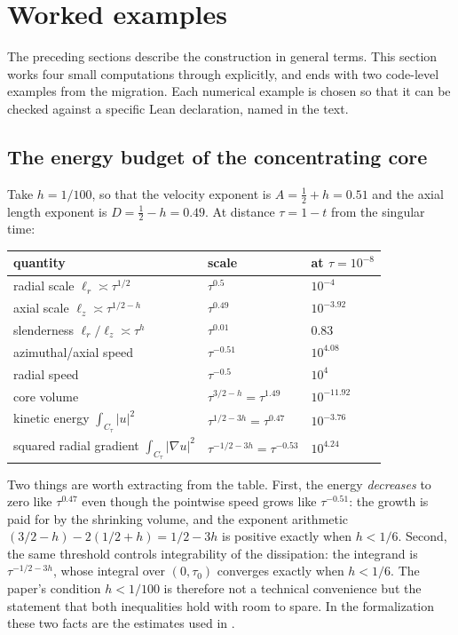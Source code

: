 \section{Worked examples}
\label{sec:examples}

The preceding sections describe the construction in general terms. This section works
four small computations through explicitly, and ends with two code-level examples from the
migration. Each numerical example is chosen so that it can be checked against a specific
Lean declaration, named in the text.

\subsection{The energy budget of the concentrating core}
\label{ex:energy}

Take $h=1/100$, so that the velocity exponent is $A=\tfrac12+h=0.51$ and the axial length
exponent is $D=\tfrac12-h=0.49$. At distance $\tau=1-t$ from the singular time:

\begin{center}\small
\begin{tabular}{@{}lll@{}}
\toprule
quantity & scale & at $\tau=10^{-8}$ \\
\midrule
radial scale $\ell_r\asymp\tau^{1/2}$ & $\tau^{0.5}$ & $10^{-4}$ \\
axial scale $\ell_z\asymp\tau^{1/2-h}$ & $\tau^{0.49}$ & $10^{-3.92}$ \\
slenderness $\ell_r/\ell_z\asymp\tau^{h}$ & $\tau^{0.01}$ & $0.83$ \\
azimuthal/axial speed & $\tau^{-0.51}$ & $10^{4.08}$ \\
radial speed & $\tau^{-0.5}$ & $10^{4}$ \\
core volume & $\tau^{3/2-h}=\tau^{1.49}$ & $10^{-11.92}$ \\
kinetic energy $\int_{C_\tau}|u|^2$ & $\tau^{1/2-3h}=\tau^{0.47}$ & $10^{-3.76}$ \\
squared radial gradient $\int_{C_\tau}|\nabla u|^2$ & $\tau^{-1/2-3h}=\tau^{-0.53}$ & $10^{4.24}$ \\
\bottomrule
\end{tabular}
\end{center}

Two things are worth extracting from the table. First, the energy \emph{decreases} to zero
like $\tau^{0.47}$ even though the pointwise speed grows like $\tau^{-0.51}$: the growth is
paid for by the shrinking volume, and the exponent arithmetic
$(3/2-h)-2(1/2+h)=1/2-3h$ is positive exactly when $h<1/6$. Second, the same threshold
controls integrability of the dissipation: the integrand is $\tau^{-1/2-3h}$, whose integral
over $(0,\tau_0)$ converges exactly when $h<1/6$. The paper's condition $h<1/100$ is
therefore not a technical convenience but the statement that both inequalities hold with
room to spare. In the formalization these two facts are the estimates
 used in
.

